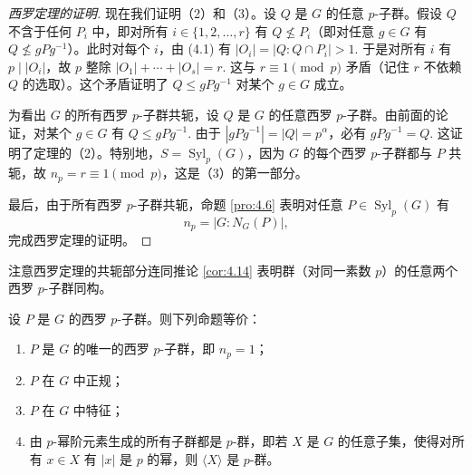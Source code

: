 \begin{proof}[西罗定理的证明]
现在我们证明（2）和（3）。设 \(Q\) 是 \(G\) 的任意 \(p\)-子群。假设 \(Q\) 不含于任何 \(P_i\) 中，即对所有 \(i \in \{1, 2, \ldots, r\}\) 有 \(Q \not\leq P_i\)（即对任意 \(g \in G\) 有 \(Q \not\leq gPg^{-1}\)）。此时对每个 \(i\)，由 (4.1) 有 \(|O_i| = |Q : Q \cap P_i| > 1\). 于是对所有 \(i\) 有 \(p \mid |O_i|\)，故 \(p\) 整除 \(|O_1| + \cdots + |O_s| = r\). 这与 \(r \equiv 1 \pmod{p}\) 矛盾（记住 \(r\) 不依赖 \(Q\) 的选取）。这个矛盾证明了 \(Q \leq gPg^{-1}\) 对某个 \(g \in G\) 成立。

为看出 \(G\) 的所有西罗 \(p\)-子群共轭，设 \(Q\) 是 \(G\) 的任意西罗 \(p\)-子群。由前面的论证，对某个 \(g \in G\) 有 \(Q \leq gPg^{-1}\). 由于 \(|gPg^{-1}| = |Q| = p^\alpha\)，必有 \(gPg^{-1} = Q\). 这证明了定理的（2）。特别地，\(S = \operatorname{Syl}_p(G)\)，因为 \(G\) 的每个西罗 \(p\)-子群都与 \(P\) 共轭，故 \(n_p = r \equiv 1 \pmod{p}\)，这是（3）的第一部分。

最后，由于所有西罗 \(p\)-子群共轭，命题 \ref{pro:4.6} 表明对任意 \(P \in \operatorname{Syl}_p(G)\) 有
\[
n_p = |G : N_G(P)|,
\]
完成西罗定理的证明。
\end{proof}

注意西罗定理的共轭部分连同推论 \ref{cor:4.14} 表明群（对同一素数 \(p\)）的任意两个西罗 \(p\)-子群同构。

\begin{corollary}\label{cor:4.20}
设 \(P\) 是 \(G\) 的西罗 \(p\)-子群。则下列命题等价：

\begin{enumerate}[label=(\arabic*)]
\item \(P\) 是 \(G\) 的唯一的西罗 \(p\)-子群，即 \(n_p = 1\)；
\item \(P\) 在 \(G\) 中正规；
\item \(P\) 在 \(G\) 中特征；
\item 由 \(p\)-幂阶元素生成的所有子群都是 \(p\)-群，即若 \(X\) 是 \(G\) 的任意子集，使得对所有 \(x \in X\) 有 \(|x|\) 是 \(p\) 的幂，则 \(\langle X \rangle\) 是 \(p\)-群。
\end{enumerate}
\end{corollary}

